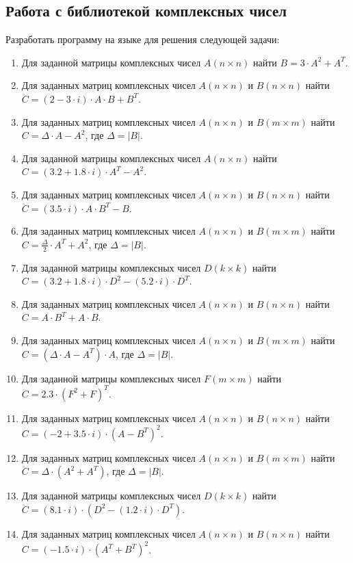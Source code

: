 \subsection[Работа с библиотекой комплексных чисел]{Работа с библиотекой комплексных чисел}
Разработать программу на языке  для решения следующей задачи:

\begin{enumerate}
\item Для заданной матрицы комплексных чисел $A(n\times n)$ найти  $B=3\cdot A^2+A^T$.
\item Для заданных матриц комплексных чисел $A(n\times n)$ и $B(n\times n)$ найти  $C=(2-3\cdot i)\cdot A\cdot B+B^T$.
\item Для заданных матриц комплексных чисел $A(n\times n)$ и $B(m\times m)$ найти  $C=\Delta\cdot A-A^2$, где  $\Delta=|B|$.
\item Для заданной матрицы комплексных чисел $A(n\times n)$ найти  $C=(3.2+1.8\cdot i)\cdot A^T-A^2$.
\item Для заданных матриц комплексных чисел $A(n \times n)$ и $B(n\times n)$ найти  $C=(3.5\cdot i)\cdot A\cdot B^T-B$.
\item Для заданных матриц комплексных чисел $A(n \times n)$ и $B(m \times m)$ найти  $C=\frac{\Delta}2\cdot A^T+A^2$, где  $\Delta=|B|$.
\item Для заданной матрицы комплексных чисел $D(k \times k)$ найти  $C=(3.2+1.8\cdot i)\cdot D^2-(5.2\cdot i)\cdot D^T$.
\item Для заданных матриц комплексных чисел $A(n \times n)$ и $B(n \times n)$ найти  $C=A\cdot B^T+A\cdot B$.
\item Для заданных матриц комплексных чисел $A(n \times n)$ и $B(m \times m)$ найти  $C=(\Delta\cdot A-A^T)\cdot A$, где  $\Delta=|B|$.
\item Для заданной матрицы комплексных чисел $F(m \times m)$ найти  $C=2.3\cdot (F^2+F)^T$.
\item Для заданных матриц комплексных чисел $A(n \times n)$ и $B(n \times n)$ найти  $C=(-2+3.5\cdot i)\cdot (A-B^T)^2$.
\item Для заданных матриц комплексных чисел $A(n \times n)$ и $B(m \times m)$ найти  $C=\Delta\cdot (A^2+A^T)$, где  $\Delta=|B|$.
\item Для заданной матрицы комплексных чисел $D(k \times k)$ найти  $C=(8.1\cdot i)\cdot (D^2-(1.2\cdot i)\cdot D^T)$.
\item Для заданных матриц комплексных чисел $A(n \times n)$ и $B(n \times n)$ найти  $C=(-1.5\cdot i)\cdot (A^T+B^T)^2$.

\end{enumerate}

